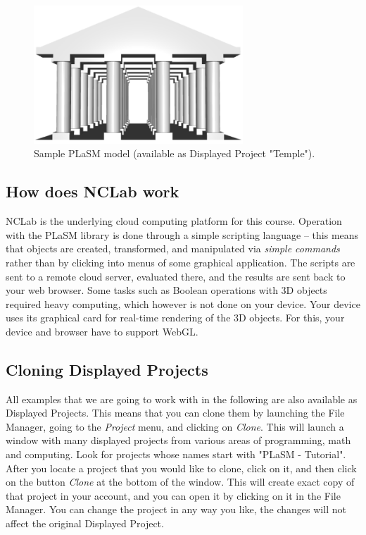 \documentclass{article}
\begin{document}
\begin{figure}[!ht]
\begin{center}
\includegraphics[width=0.7\textwidth]{img/temple0.png}
\end{center}
\vspace{-2mm}
\caption{Sample PLaSM model (available as Displayed Project "Temple").}
\vspace{-1cm}
\label{fig:pisa}
\end{figure}
\newpage
\subsection{How does NCLab work}

NCLab is the underlying cloud computing platform for this course. Operation with the 
PLaSM library is done through a simple scripting language -- this means that 
objects are created, transformed, and manipulated via {\em simple commands} rather 
than by clicking into menus of some graphical application. The scripts are 
sent to a remote cloud server, evaluated there, and the results are sent back
to your web browser. Some tasks such as Boolean operations with 3D objects 
required heavy computing, which however is not done on your device. Your device
uses its graphical card for real-time rendering of the 3D objects. For this, 
your device and browser have to support WebGL.

\subsection{Cloning Displayed Projects}

All examples that we are going to work with in the following are also available 
as Displayed Projects. This means that you can clone them by launching the File
Manager, going to the {\em Project} menu, and clicking on {\em Clone}. This will launch 
a window with many displayed projects from various areas of programming,
math and computing. Look for projects whose names start with "PLaSM - Tutorial".
After you locate a project that you would like to clone, click on it,
and then click on the button {\em Clone} at the bottom of the window. This will
create exact copy of that project in your account, and you can open it 
by clicking on it in the File Manager. You can change the project in any way 
you like, the changes will not affect the original Displayed Project. 
\end{document}
